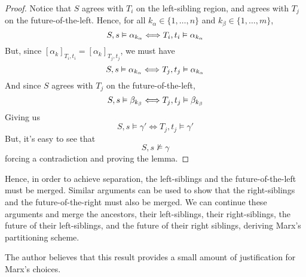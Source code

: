 \documentclass[a4paper,UKenglish,cleveref, autoref, thm-restate, numberwithinsect]{lipics-v2021}
\begin{document}
\begin{proof}
    Notice that $S$ agrees with $T_i$ on the left-sibling region, and agrees with $T_j$ on the future-of-the-left. Hence, for all $k_\alpha \in \{1, \ldots, n\}$ and $k_\beta \in \{1, \ldots, m\}$,
    \begin{equation*}
        S, s \vDash \alpha_{k_\alpha} \Longleftrightarrow T_i, t_i \vDash \alpha_{k_\alpha}\\
    \end{equation*}
    But, since $[\alpha_k]_{T_i, t_i} = [\alpha_k]_{T_j, t_j}$, we must have
    \begin{equation*}
        S, s \vDash \alpha_{k_\alpha} \Longleftrightarrow T_j, t_j \vDash \alpha_{k_\alpha}\\
    \end{equation*}
    And since $S$ agrees with $T_j$ on the future-of-the-left,
    \begin{equation*}
        S, s \vDash \beta_{k_\beta} \Longleftrightarrow T_j, t_j \vDash \beta_{k_\beta}\\
    \end{equation*}
    Giving us
    \begin{equation*}
        S, s \vDash \gamma' \Longleftrightarrow T_j, t_j \vDash \gamma'
    \end{equation*}
    But, it's easy to see that
    \begin{equation*}
        S, s \nvDash \gamma
    \end{equation*}
    forcing a contradiction and proving the lemma.
\end{proof}
Hence, in order to achieve separation, the left-siblings and the future-of-the-left must be merged. Similar arguments can be used to show that the right-siblings and the future-of-the-right must also be merged. We can continue these arguments and merge the ancestors, their left-siblings, their right-siblings, the future of their left-siblings, and the future of their right siblings, deriving Marx's partitioning scheme.

The author believes that this result provides a small amount of justification for Marx's choices.









\end{document}

